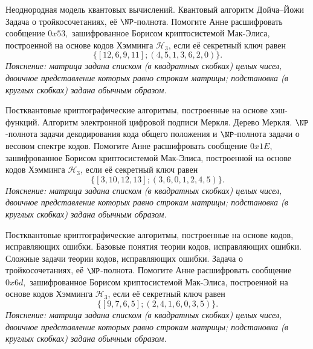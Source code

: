 
\begin{questions}
    \question
        Неоднородная модель квантовых вычислений. Квантовый алгоритм Дойча--Йожи
    \question
        Задача о тройкосочетаниях, её \(\NP\)-полнота.
    \question
        Помогите Анне расшифровать сообщение \(0x53,\) зашифрованное Борисом криптосистемой Мак-Элиса, построенной на основе кодов Хэмминга \(\mathcal{H}_3\), если её секретный ключ равен 
        \[\{[12, 6, 9, 11]; (4, 5, 1, 3, 6, 2, 0)\}.\]
        \emph{Пояснение: матрица задана списком (в квадратных скобках) целых чисел, двоичное представление которых равно строкам матрицы; подстановка (в круглых скобках) задана обычным образом.}

\end{questions}


\begin{questions}
    \question
        Постквантовые криптографические алгоритмы, построенные на основе хэш-функций.
        Алгоритм электронной цифровой подписи Меркля.
        Дерево Меркля.
    \question
        \(\NP\)-полнота задачи декодирования кода общего положения и \(\NP\)-полнота задачи о весовом спектре кодов.
    \question
        Помогите Анне расшифровать сообщение \(0x1E,\) зашифрованное Борисом криптосистемой Мак-Элиса, построенной на основе кодов Хэмминга \(\mathcal{H}_3\), если её секретный ключ равен 
        \[\{[3, 10, 12, 13]; (3, 6, 0, 1, 2, 4, 5)\}.\]
        \emph{Пояснение: матрица задана списком (в квадратных скобках) целых чисел, двоичное представление которых равно строкам матрицы; подстановка (в круглых скобках) задана обычным образом.}
\end{questions}


\begin{questions}
    \question
        Постквантовые криптографические алгоритмы, построенные на основе кодов, исправляющих ошибки.
        Базовые понятия теории кодов, исправляющих ошибки.
        Сложные задачи теории кодов, исправляющих ошибки.
    \question
        Задача о тройкосочетаниях, её \(\NP\)-полнота.
    \question
        Помогите Анне расшифровать сообщение \(0x6d,\) зашифрованное Борисом криптосистемой Мак-Элиса, построенной на основе кодов Хэмминга \(\mathcal{H}_3\), если её секретный ключ равен 
        \[\{[9, 7, 6, 5]; (2, 4, 1, 6, 0, 3, 5)\}.\]
        \emph{Пояснение: матрица задана списком (в квадратных скобках) целых чисел, двоичное представление которых равно строкам матрицы; подстановка (в круглых скобках) задана обычным образом.}
\end{questions}


